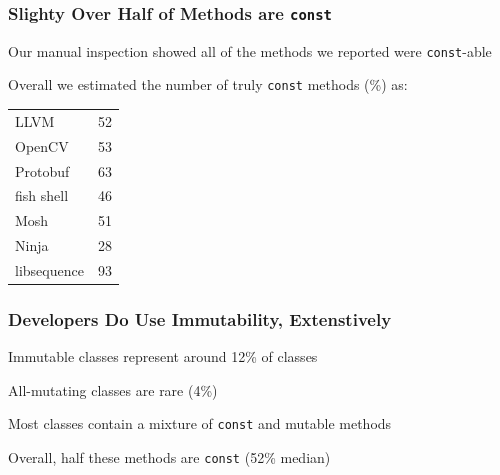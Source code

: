\documentclass[aspectratio=169]{beamer}
\newcommand{\const}{\texttt{\bfseries const}}
\begin{document}
\begin{frame}
  \end{frame}

  \begin{frame}
    \frametitle{Slighty Over Half of Methods are \texttt{const}}

    Our manual inspection showed all of the methods we reported were
    \texttt{const}-able

    \vspace{2em}

    Overall we estimated the number of truly \texttt{const} methods (\%) as:

    \vspace{1em}
    
    \begin{center}\begin{tabular}{l r}
      LLVM         & 52\\
      OpenCV       & 53\\
      Protobuf     & 63 \\
      fish shell   & 46 \\
      Mosh         & 51 \\
      Ninja        & 28 \\
      libsequence  & 93 \\
    \end{tabular}\end{center}
  \end{frame}

  \begin{frame}
    \frametitle{Developers Do Use Immutability, Extenstively}

    Immutable classes represent around 12\% of classes

    \hspace{1em} All-mutating classes are rare (4\%)

    \vspace{2em}

    Most classes contain a mixture of \texttt{const} and mutable methods

    \hspace{1em} Overall, half these methods are \texttt{const} (52\% median)
  \end{frame}
\end{document}
